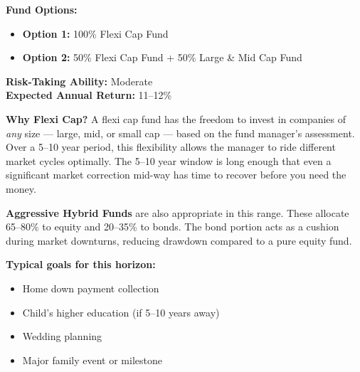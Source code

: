 \documentclass[12pt,a4paper]{article}
\begin{document}
\begin{tcolorbox}[base, colback=LongTerm!8, colframe=LongTerm,
  colbacktitle=LongTerm, coltitle=white, fonttitle=\bfseries,
  title={Horizon 3: 5--10 Years --- Balanced Growth}]

\textbf{Fund Options:}
\begin{itemize}
  \item \textbf{Option 1:} 100\% Flexi Cap Fund
  \item \textbf{Option 2:} 50\% Flexi Cap Fund + 50\% Large \& Mid Cap Fund
\end{itemize}
\textbf{Risk-Taking Ability:} Moderate\\
\textbf{Expected Annual Return:} 11--12\%

\medskip
\textbf{Why Flexi Cap?} A flexi cap fund has the freedom to invest in companies of \textit{any} size --- large, mid, or small cap --- based on the fund manager's assessment. Over a 5--10 year period, this flexibility allows the manager to ride different market cycles optimally. The 5--10 year window is long enough that even a significant market correction mid-way has time to recover before you need the money.

\medskip
\textbf{Aggressive Hybrid Funds} are also appropriate in this range. These allocate 65--80\% to equity and 20--35\% to bonds. The bond portion acts as a cushion during market downturns, reducing drawdown compared to a pure equity fund.

\medskip
\textbf{Typical goals for this horizon:}
\begin{itemize}
  \item Home down payment collection
  \item Child's higher education (if 5--10 years away)
  \item Wedding planning
  \item Major family event or milestone
\end{itemize}
\end{tcolorbox}

\vspace{3mm}
\end{document}
